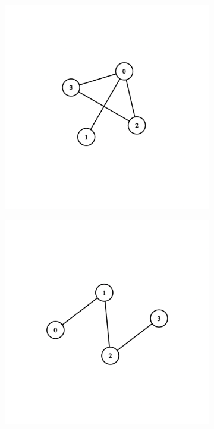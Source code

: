 \documentclass[12pt, a4paper, hidelinks]{article}
\begin{document}
\begin{figure}[H]
    \centering
    \begin{subfigure}[b]{0.45\textwidth}
        \includegraphics[width=\textwidth]{graph_v4_7.png}
    \end{subfigure}
    \begin{subfigure}[b]{0.45\textwidth}
        \includegraphics[width=\textwidth]{graph_v4_8.png}
    \end{subfigure}
\end{figure}
\end{document}
